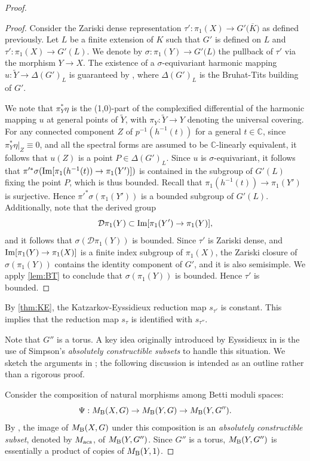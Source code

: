 \documentclass[english]{amsproc}
\theoremstyle{plain}
\theoremstyle{definition}
\theoremstyle{remark}
\theoremstyle{plain}
\numberwithin{equation}{thm} %
\newcommand{\cD}{\mathcal D}
\newcommand{\bC}{\mathbb{C}}
\begin{document}
\begin{proof}
\begin{proof}
			Consider the  Zariski dense  representation $\tau':\pi_1(X) \to G'\big( \overline{K}\big)$ as defined previously. 
			Let  $L$ be a finite extension of $K$ such that $G'$ is defined on $L$ and  $\tau':\pi_1(X)\to G'(L)$. 
			We denote by $\sigma:\pi_1(Y)\to G'\big(L\big)$ the pullback of $\tau'$ via the morphism $Y\to X$.   
			The existence of a $\sigma$-equivariant harmonic mapping $u:\widetilde{Y}\to \Delta(G')_L$ is guaranteed by \cite{GS92}, where $\Delta(G')_L$ is the Bruhat-Tits building of $G'$.
			
			We note that $\pi_Y^*\eta$ is the (1,0)-part of the complexified differential of the harmonic mapping $u$ at general points of $\widetilde{Y}$, with $\pi_Y:\widetilde{Y}\to Y$ denoting the universal covering. 
			For  any connected component $Z$ of $p^{-1}(h^{-1}(t))$ for a general $t\in \bC$, since $\pi_Y^*\eta|_{Z}\equiv 0$,   and  all the spectral forms are assumed to be $\bC$-linearly equivalent, it follows that $u(Z)$ is a point $P\in \Delta(G')_L$. 
			Since $u$ is $\sigma$-equivariant, it follows that $\pi'^*\sigma({\rm Im}[\pi_1(h^{-1}(t))\to \pi_1(Y')])$ is contained in the subgroup of $G'(L)$  fixing the point $P$, which is thus bounded. 
			Recall that $\pi_1(h^{-1}(t))\to \pi_1(Y')$  is surjective. 
			Hence $\pi'^*\sigma(\pi_1(Y'))$ is a bounded subgroup of $G'(L)$. 	
			Additionally, note that the derived group $$\cD \pi_1(Y)\subset {\rm Im}[\pi_1(Y')\to \pi_1(Y)],$$ and it follows that $\sigma(\cD \pi_1(Y))$ is bounded.  	
			Since $\tau'$ is Zariski dense, and ${\rm Im}[\pi_1(Y)\to \pi_1(X)]$ is a finite index subgroup of $\pi_1(X)$,    the Zariski closure  of $\sigma(\pi_1(Y))$ contains the identity component of $G'$, and it is also semisimple.     
			We apply \cref{lem:BT}  to conclude  that $\sigma( \pi_1(Y))$ is bounded.	  Hence $\tau'$ is bounded. 
		\end{proof} 
		By \cref{thm:KE}, the Katzarkov-Eyssidieux reduction map $s_{\tau'}$ is constant. This implies that the reduction map $s_{\tau}$ is identified with $s_{\tau''}$.
		
		Note that $G''$ is a torus. A key idea originally introduced by Eyssidieux in \cite{Eys04} is the use of Simpson's \emph{absolutely constructible subsets} to handle this situation. We sketch the arguments  in \cite[Theorem 4.5]{DY23}; the following discussion is intended as an outline rather than a rigorous proof.
		
		Consider the composition of natural morphisms among Betti moduli spaces:
		\[
	\Psi:	M_{\rm B}(X,G)\to M_{\rm B}(Y,G) \to M_{\rm B}(Y,G'').  
		\]
		By \cite{Sim93b}, the image of $M_{\rm B}(X,G)$ under this composition is an \emph{absolutely constructible subset}, denoted by $M_{\rm acs}$, of $M_{\rm B}(Y,G'')$. Since $G''$ is a torus, $M_{\rm B}(Y,G'')$ is essentially a product of copies of $M_{\rm B}(Y,1)$. 
		

\end{proof}
\end{document}

